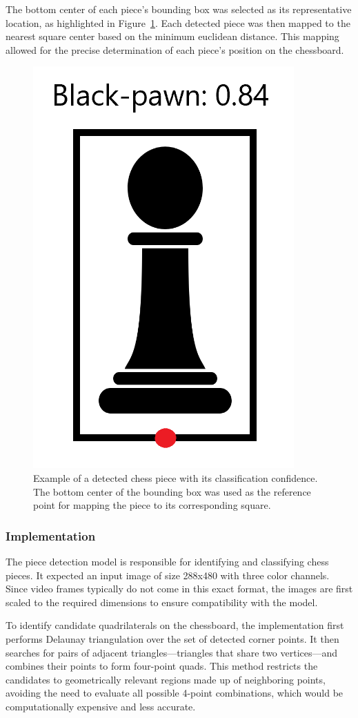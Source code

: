 The bottom center of each piece’s bounding box was selected as its representative location, as highlighted in Figure~\ref{fig:bbox-black-pawn}. Each detected piece was then mapped to the nearest square center based on the minimum euclidean distance. This mapping allowed for the precise determination of each piece's position on the chessboard.



\newpage

\begin{figure}[h!]
    \centering
    \includegraphics[width=0.25\linewidth]{figures/methods/ml-models/black-pawn.png}
    \caption[FIX]{Example of a detected chess piece with its classification confidence. The bottom center of the bounding box was used as the reference point for mapping the piece to its corresponding square. \cite{svgrepo:black-pawn-svg}}
    \label{fig:bbox-black-pawn}
\end{figure}

\subsubsection*{Implementation}







The piece detection model is responsible for identifying and classifying chess pieces. It expected an input image of size 288x480 with three color channels. Since video frames typically do not come in this exact format, the images are first scaled to the required dimensions to ensure compatibility with the model.

To identify candidate quadrilaterals on the chessboard, the implementation first performs Delaunay triangulation over the set of detected corner points. It then searches for pairs of adjacent triangles—triangles that share two vertices—and combines their points to form four-point quads. This method restricts the candidates to geometrically relevant regions made up of neighboring points, avoiding the need to evaluate all possible 4-point combinations, which would be computationally expensive and less accurate.



